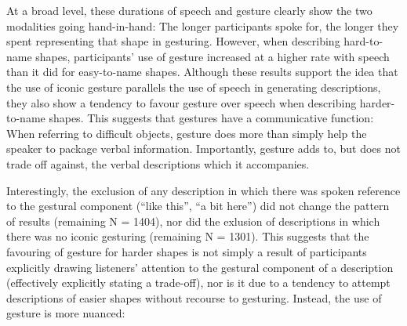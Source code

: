 \documentclass[a4paper,man,natbib]{apa6}
\newcommand*{\spex}[1]{``{#1}''} %
\begin{document}
At a broad level, these durations of speech and gesture clearly show the two modalities going hand-in-hand: The longer participants spoke for, the longer they spent representing that shape in gesturing.
However, when describing hard-to-name shapes, participants' use of gesture increased at a higher rate with speech than it did for easy-to-name shapes.
Although these results support the idea that the use of iconic gesture parallels the use of speech in generating descriptions, they also show a tendency to favour gesture over speech when describing harder-to-name shapes.
This suggests that gestures have a communicative function: When referring to difficult objects, gesture does more than simply help the speaker to package verbal information.
Importantly, gesture adds to, but does not trade off against, the verbal descriptions which it accompanies.

Interestingly, the exclusion of any description in which there was spoken reference to the gestural component (\spex{like this}, \spex{a bit here}) did not change the pattern of results (remaining N = 1404), nor did the exlusion of descriptions in which there was no iconic gesturing (remaining N = 1301).
This suggests that the favouring of gesture for harder shapes is not simply a result of participants explicitly drawing listeners' attention to the gestural component of a description (effectively explicitly stating a trade-off), nor is it due to a tendency to attempt descriptions of easier shapes without recourse to gesturing. 
Instead, the use of gesture is more nuanced: 












 




\end{document}
